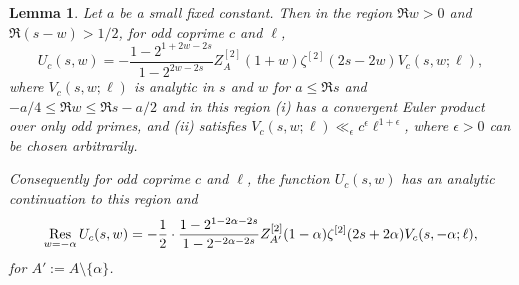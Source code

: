 \documentclass[12pt]{amsart}
\newtheorem{lemma}{Lemma}
\begin{document}
	\begin{lemma}
		\label{lemma:singularity location}
		Let $a$ be a small fixed constant. Then in the region $\Re w > 0$ and $\Re(s-w) > 1/2$, for odd coprime $c$ and $\ell$,
		\begin{equation}
			\label{eq:Uc(s,w) continuation}
			U_c(s,w) = -\frac{1-2^{1+2w-2s}}{1-2^{2w-2s}} Z^{[2]}_A(1+w) \zeta^{[2]}(2s-2w) V_c(s,w;\ell),
		\end{equation}
		where $V_c(s,w;\ell)$ is analytic in $s$ and $w$ for $a \leq \Re s$ and $-a/4 \leq \Re w \leq \Re s -a/2$ and in this region (i) has a convergent Euler product over only odd primes, and (ii) satisfies $V_c(s,w;\ell) \ll_\epsilon c^\epsilon \ell^{1+\epsilon}$, where $\epsilon > 0$ can be chosen arbitrarily.
		
		Consequently for odd coprime $c$ and $\ell$, the function $U_c(s,w)$ has an analytic continuation to this region and
		\begin{equation}
			\label{eq:ResUc(s,w) continuation}
			\operatornamewithlimits{Res}_{w = -\alpha} U_c(s,w) = -\frac{1}{2} \cdot \frac{1-2^{1-2\alpha-2s}}{1-2^{-2\alpha-2s}} Z^{[2]}_{A'}(1-\alpha) \zeta^{[2]}(2s+2\alpha) V_c(s,-\alpha;\ell),
		\end{equation}
		for $A':= A \setminus \{\alpha\}$.
	\end{lemma}
	
\end{document}
